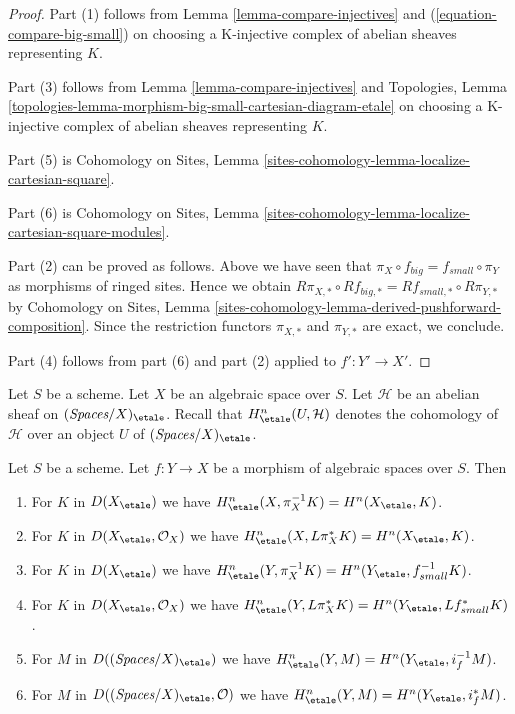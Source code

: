 \begin{proof}
Part (1) follows from
Lemma \ref{lemma-compare-injectives}
and (\ref{equation-compare-big-small})
on choosing a K-injective complex of abelian sheaves representing $K$.

\medskip\noindent
Part (3) follows from Lemma \ref{lemma-compare-injectives}
and Topologies, Lemma
\ref{topologies-lemma-morphism-big-small-cartesian-diagram-etale}
on choosing a K-injective complex of abelian sheaves representing $K$.

\medskip\noindent
Part (5) is Cohomology on Sites, Lemma
\ref{sites-cohomology-lemma-localize-cartesian-square}.

\medskip\noindent
Part (6) is  Cohomology on Sites, Lemma
\ref{sites-cohomology-lemma-localize-cartesian-square-modules}.

\medskip\noindent
Part (2) can be proved as follows. Above we have seen
that $\pi_X \circ f_{big} = f_{small} \circ \pi_Y$ as morphisms
of ringed sites. Hence we obtain
$R\pi_{X, *} \circ Rf_{big, *} = Rf_{small, *} \circ R\pi_{Y, *}$
by Cohomology on Sites, Lemma
\ref{sites-cohomology-lemma-derived-pushforward-composition}.
Since the restriction functors $\pi_{X, *}$ and $\pi_{Y, *}$
are exact, we conclude.

\medskip\noindent
Part (4) follows from part (6) and part (2) applied to $f' : Y' \to X'$.
\end{proof}

\noindent
Let $S$ be a scheme. Let $X$ be an algebraic space over $S$.
Let $\mathcal{H}$ be an abelian sheaf on
$(\textit{Spaces}/X)_\etale$. Recall that $H^n_\etale(U, \mathcal{H})$
denotes the cohomology of $\mathcal{H}$ over an object
$U$ of $(\textit{Spaces}/X)_\etale$.

\begin{lemma}
\label{lemma-compare-cohomology}
Let $S$ be a scheme.
Let $f : Y \to X$ be a morphism of algebraic spaces over $S$. Then
\begin{enumerate}
\item For $K$ in $D(X_\etale)$ we have
$H^n_\etale(X, \pi_X^{-1}K) = H^n(X_\etale, K)$.
\item For $K$ in $D(X_\etale, \mathcal{O}_X)$ we have
$H^n_\etale(X, L\pi_X^*K) = H^n(X_\etale, K)$.
\item For $K$ in $D(X_\etale)$ we have
$H^n_\etale(Y, \pi_X^{-1}K) = H^n(Y_\etale, f_{small}^{-1}K)$.
\item For $K$ in $D(X_\etale, \mathcal{O}_X)$ we have
$H^n_\etale(Y, L\pi_X^*K) = H^n(Y_\etale, Lf_{small}^*K)$.
\item For $M$ in $D((\textit{Spaces}/X)_\etale)$ we have
$H^n_\etale(Y, M) = H^n(Y_\etale, i_f^{-1}M)$.
\item For $M$ in $D((\textit{Spaces}/X)_\etale, \mathcal{O})$ we have
$H^n_\etale(Y, M) = H^n(Y_\etale, i_f^*M)$.
\end{enumerate}
\end{lemma}

